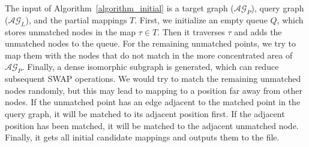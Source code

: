 \documentclass[runningheads]{llncs}
\begin{document}
	The input of Algorithm~\ref{algorithm_initial} is a target graph ($\mathcal{AG}_{P}$), query graph ($\mathcal{AG}_{L}$), and the partial mappings $T$. First, we initialize an empty queue $Q$,  which stores unmatched nodes in the map $\tau \in T$.
	Then it traverses $\tau$ and adds the unmatched nodes to the queue.  For the remaining unmatched points, we try to map them with the nodes that do not match in the more concentrated area of $\mathcal{AG}_{P}$. Finally, a dense isomorphic subgraph is generated, which can reduce subsequent SWAP operations. We would try to match the remaining unmatched nodes randomly, but this may lead to mapping to a position far away from other nodes. If the unmatched point has an edge adjacent to the matched point in the query graph, it will be matched to its adjacent position first. If the adjacent position has been matched, it will be matched to the adjacent unmatched node. Finally, it gets all initial candidate mappings and outputs them to the file.
\end{document}
